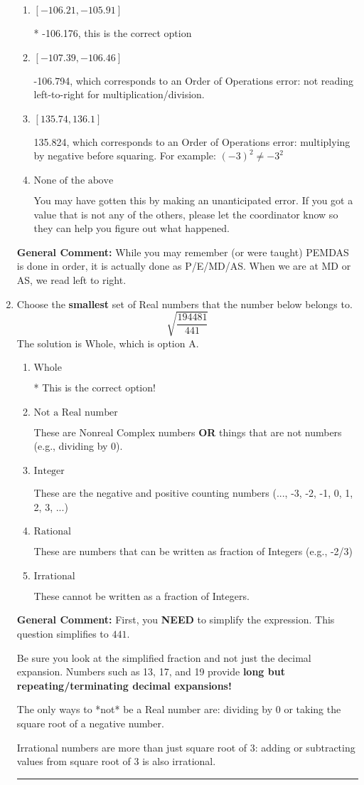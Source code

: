 \documentclass{extbook}[14pt]
\newcommand{\litem}[1]{\item #1

\rule{\textwidth}{0.4pt}}
\begin{document}
\begin{enumerate}
{\begin{enumerate}[label=\Alph*.]
 135.206, which corresponds to two Order of Operations errors.
\item \( [-106.21, -105.91] \)

* -106.176, this is the correct option
\item \( [-107.39, -106.46] \)

 -106.794, which corresponds to an Order of Operations error: not reading left-to-right for multiplication/division.
\item \( [135.74, 136.1] \)

 135.824, which corresponds to an Order of Operations error: multiplying by negative before squaring. For example: $(-3)^2 \neq -3^2$
\item \( \text{None of the above} \)

 You may have gotten this by making an unanticipated error. If you got a value that is not any of the others, please let the coordinator know so they can help you figure out what happened.
\end{enumerate}

\textbf{General Comment:} While you may remember (or were taught) PEMDAS is done in order, it is actually done as P/E/MD/AS. When we are at MD or AS, we read left to right.
}
\litem{
Choose the \textbf{smallest} set of Real numbers that the number below belongs to.
\[ \sqrt{\frac{194481}{441}} \]
The solution is \( \text{Whole} \), which is option A.\begin{enumerate}[label=\Alph*.]
\item \( \text{Whole} \)

* This is the correct option!
\item \( \text{Not a Real number} \)

These are Nonreal Complex numbers \textbf{OR} things that are not numbers (e.g., dividing by 0).
\item \( \text{Integer} \)

These are the negative and positive counting numbers (..., -3, -2, -1, 0, 1, 2, 3, ...)
\item \( \text{Rational} \)

These are numbers that can be written as fraction of Integers (e.g., -2/3)
\item \( \text{Irrational} \)

These cannot be written as a fraction of Integers.
\end{enumerate}

\textbf{General Comment:} First, you \textbf{NEED} to simplify the expression. This question simplifies to $441$. 
 
 Be sure you look at the simplified fraction and not just the decimal expansion. Numbers such as 13, 17, and 19 provide \textbf{long but repeating/terminating decimal expansions!} 
 
 The only ways to *not* be a Real number are: dividing by 0 or taking the square root of a negative number. 
 
 Irrational numbers are more than just square root of 3: adding or subtracting values from square root of 3 is also irrational.
}
\end{enumerate}
\end{document}
